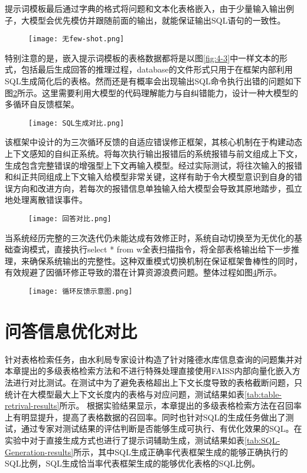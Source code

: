 提示词模板最后通过字典的格式将问题和文本化表格嵌入，由于少量输入输出例子，大模型会优先模仿并跟随前面的输出，就能保证输出SQL语句的一致性。
\begin{figure}[!htbp]
    \centering
    \texttt{[image: 无few-shot.png]}
    \label{fig:4-4}
\end{figure}
特别注意的是，嵌入提示词模板的表格数据都将是以图\ref{fig:4-3}中一样文本的形式，包括最后生成回答的推理过程，database的文件形式只用于在框架内部利用SQL生成简化后的表格。然而还是有概率会出现输出SQL命令执行出错的问题如下图\ref{fig:4-5}所示。这里需要利用大模型的代码理解能力与自纠错能力，设计一种大模型的多循环自反馈框架。
\begin{figure}[!htbp]
    \centering
    \texttt{[image: SQL生成对比.png]}
    \label{fig:4-5}
\end{figure}

该框架中设计的为三次循环反馈的自适应错误修正框架，其核心机制在于构建动态上下文感知的自纠正系统。将每次执行输出报错后的系统报错与前文组成上下文，生成包含完整错误的增强型上下文再输入模型。经过实际测试，将往次输入的报错和纠正共同组成上下文输入给模型非常关键，这样有助于令大模型意识到自身的错误方向和改进方向，若每次的报错信息单独输入给大模型会导致其原地踏步，孤立地处理离散错误事件。
\begin{figure}[!htb]
    \centering
    \texttt{[image: 回答对比.png]}
    \label{fig:4-7}
\end{figure}
当系统经历完整的三次迭代仍未能达成有效修正时，系统自动切换至为无优化的基础查询模式，直接执行select * from w全表扫描指令，将全部表格输出给下一步推理，来确保系统输出的完整性。这种双重模式切换机制在保证框架鲁棒性的同时，有效规避了因循环修正导致的潜在计算资源浪费问题。整体过程如图\ref{fig:4-6}所示。
\begin{figure}[htbp]
    \centering
    \texttt{[image: 循环反馈示意图.png]}
    \label{fig:4-6}
\end{figure}

\section{问答信息优化对比}
针对表格检索任务，由水利局专家设计构造了针对隆德水库信息查询的问题集并对本章提出的多级表格检索方法和不进行特殊处理直接使用FAISS内部向量化嵌入方法进行对比测试。在测试中为了避免表格超出上下文长度导致的表格截断问题，只统计在大模型最大上下文长度内的表格与对应问题，测试结果如表\ref{tab:table-retrival-results}所示。
根据实验结果显示，本章提出的多级表格检索方法在召回率上有明显提升，提高了表格数据的召回率。同时也针对SQL的生成任务做出了测试，通过专家对测试结果的评估判断是否能够生成可执行、有优化效果的SQL。在实验中对于直接生成方式也进行了提示词辅助生成，测试结果如表\ref{tab:SQL-Generation-results}所示，其中SQL生成正确率代表框架生成的能够正确执行的SQL比例，SQL生成恰当率代表框架生成的能够优化表格的SQL比例。

